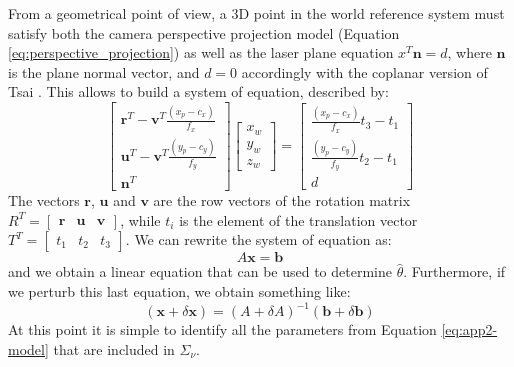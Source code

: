 From a geometrical point of view, a 3D point in the world reference system must satisfy both the camera perspective projection model (Equation \ref{eq:perspective_projection}) as well as the laser plane equation $x^T\boldsymbol{n} = d$, where $\boldsymbol{n}$ is the plane normal vector, and $d = 0$ accordingly with the coplanar version of Tsai \cite{TsaiTvLenses}. This allows to build a system of equation, described by: 
  \begin{equation}
    \begin{bmatrix}
      \boldsymbol{r}^T - \boldsymbol{v}^T \frac{(x_p - c_x)}{f_x} \\
      \boldsymbol{u}^T - \boldsymbol{v}^T \frac{(y_p - c_y)}{f_y} \\
      \boldsymbol{n}^T
    \end{bmatrix}
    \begin{bmatrix}
      x_w \\ y_w \\ z_w
    \end{bmatrix}
    =
    \begin{bmatrix}
      \frac{(x_p - c_x)}{f_x} t_3 - t_1 \\
      \frac{(y_p - c_y)}{f_y} t_2 - t_1 \\
      d
    \end{bmatrix}
    \label{eq:app2-model}
  \end{equation}
The vectors $\boldsymbol{r}$, $\boldsymbol{u}$ and $\boldsymbol{v}$ are the row vectors of the rotation matrix $R^T = \begin{bmatrix} \boldsymbol{r} & \boldsymbol{u} & \boldsymbol{v} \end{bmatrix}$, while $t_i$ is the element of the translation vector $T^T = \begin{bmatrix} t_1 & t_2 & t_3 \end{bmatrix}$. We can rewrite the system of equation as:
  \begin{equation*}
    A\boldsymbol{x} = \boldsymbol{b}
  \end{equation*}
and we obtain a linear equation that can be used to determine $\hat{\theta}$. Furthermore, if we perturb this last equation, we obtain something like:
  \begin{equation*}
    (\boldsymbol{x} + \delta \boldsymbol{x}) = (A + \delta A)^{-1}(\boldsymbol{b} + \delta \boldsymbol{b})
  \end{equation*}
At this point it is simple to identify all the parameters from Equation \ref{eq:app2-model} that are included in $\Sigma_{\nu}$. \\

